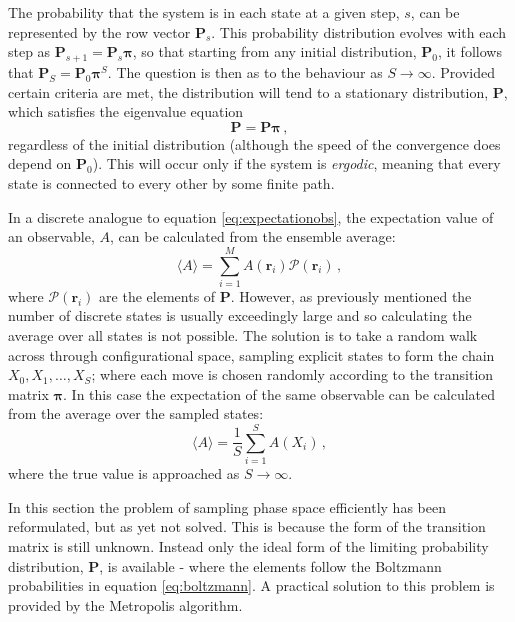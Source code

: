 The probability that the system is in each state at a given step, $s$, can be represented by the row vector $\mathbf{P}_s$.
This probability distribution evolves with each step as $\mathbf{P}_{s+1}=\mathbf{P}_{s}\bm{\pi}$, so that starting from any initial distribution, $\mathbf{P}_0$, it follows that $\mathbf{P}_S=\mathbf{P}_0\bm{\pi}^S$. 
The question is then as to the behaviour as $S\rightarrow \infty$.
Provided certain criteria are met, the distribution will tend to a stationary distribution, $\mathbf{P}$, which satisfies the eigenvalue equation 
\begin{equation}
	\mathbf{P} = \mathbf{P}\bm{\pi}\,, \label{eq:mcmceig}
\end{equation}
regardless of the initial distribution (although the speed of the convergence does depend on $\mathbf{P}_0$).
This will occur only if the system is \textit{ergodic}, meaning that every state is connected to every other by some finite path.

In a discrete analogue to equation \eqref{eq:expectationobs}, the expectation value of an observable, $A$, can be calculated from the ensemble average:
\begin{equation}
	\langle A \rangle = \sum_{i=1}^{M} A\left(\mathbf{r}_i\right)\mathcal{P}\left(\mathbf{r}_i\right)\,,
\end{equation}
where $\mathcal{P}\left(\mathbf{r}_i\right)$ are the elements of $\mathbf{P}$.
However, as previously mentioned the number of discrete states is usually exceedingly large and so calculating the average over all states is not possible.
The solution is to take a random walk across through configurational space, sampling explicit states to form the chain $X_0,X_1,\dots,X_S$; where each move is chosen randomly according to the transition matrix $\bm{\pi}$.
In this case the expectation of the same observable can be calculated from the average over the sampled states:
\begin{equation}
	\langle A \rangle = \frac{1}{S}\sum_{i=1}^{S} A\left(X_i\right)\,,
\end{equation}
where the true value is approached as $S\rightarrow \infty$.

In this section the problem of sampling phase space efficiently has been reformulated, but as yet not solved. 
This is because the form of the transition matrix is still unknown.
Instead only the ideal form of the limiting probability distribution, $\mathbf{P}$, is available \-- where the elements follow the Boltzmann probabilities in equation \eqref{eq:boltzmann}.
A practical solution to this problem is provided by the Metropolis algorithm.

